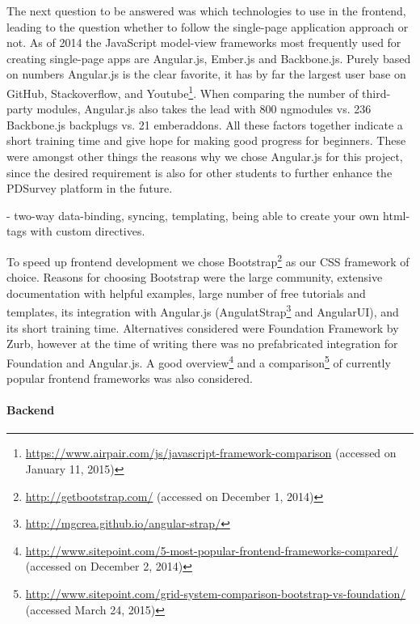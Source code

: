 		The next question to be answered was which technologies to use in the frontend, leading to the question whether to follow the single-page application approach or not. As of 2014 the JavaScript model-view frameworks most frequently used for creating single-page apps are Angular.js, Ember.js and Backbone.js. Purely based on numbers Angular.js is the clear favorite, it has by far the largest user base on GitHub, Stackoverflow, and Youtube\footnote{\url{https://www.airpair.com/js/javascript-framework-comparison} (accessed on January 11, 2015)}. When comparing the number of third-party modules, Angular.js also takes the lead with 800 ngmodules vs. 236 Backbone.js backplugs vs. 21 emberaddons. All these factors together indicate a short training time and give hope for making good progress for beginners. These were amongst other things the reasons why we chose Angular.js for this project, since the desired requirement is also for other students to further enhance the PDSurvey platform in the future.

			- two-way data-binding, syncing, templating, being able to create your own html-tags with custom directives.

		To speed up frontend development we chose Bootstrap\footnote{\url{http://getbootstrap.com/} (accessed on December 1, 2014)} as our CSS framework of choice. Reasons for choosing Bootstrap were the large community, extensive documentation with helpful examples, large number of free tutorials and templates, its integration with Angular.js (AngulatStrap\footnote{\url{http://mgcrea.github.io/angular-strap/}} and AngularUI), and its short training time.
		Alternatives considered were Foundation Framework by Zurb, however at the time of writing there was no prefabricated integration for Foundation and Angular.js.
		A good overview\footnote{\url{http://www.sitepoint.com/5-most-popular-frontend-frameworks-compared/} (accessed on December 2, 2014)} and a comparison\footnote{\url{http://www.sitepoint.com/grid-system-comparison-bootstrap-vs-foundation/} (accessed March 24, 2015)} of currently popular frontend frameworks was also considered.

	

	\paragraph{Backend}

